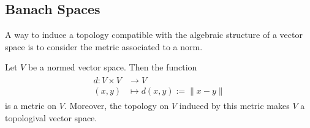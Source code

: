 \subsection{Banach Spaces}

A way to induce a topology compatible with the algebraic structure of a vector space is to consider the metric associated to a norm.

\begin{theorem}
	Let $V$ be a normed vector space. Then the function 
	\begin{align}\label{eq:norm_metric}
	\begin{split}
		d:V\times V&\rightarrow V\\
		(x,y)&\mapsto d(x,y):=\|x-y\|
	\end{split}
	\end{align}
is a metric on $V$. Moreover, the topology on $V$ induced by this metric makes $V$ a topologival vector space.
\end{theorem}

